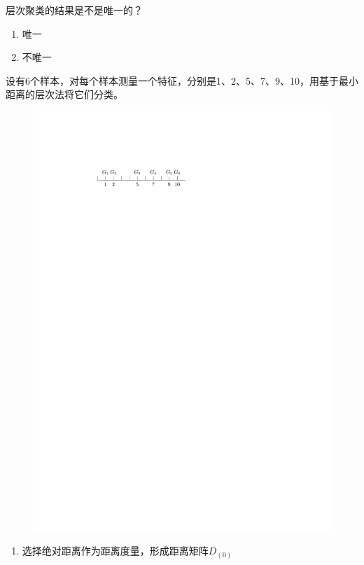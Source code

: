 \begin{example}
    层次聚类的结果是不是唯一的？
    \begin{enumerate}[A]
        \item 唯一
        \item \textcolor{main1}{不唯一}
    \end{enumerate}
\end{example}
\begin{example}
    设有6个样本，对每个样本测量一个特征，分别是1、2、5、7、9、10，用基于\textcolor{main1}{最小距离}的层次法将它们分类。
    \begin{figure}[htbp]
        \centering
        \includegraphics{image/层次聚类举例.pdf}
    \end{figure}
    \begin{enumerate}
        \item 选择绝对距离作为距离度量，形成距离矩阵$D_{(0)}$

\end{enumerate}
\end{example}

